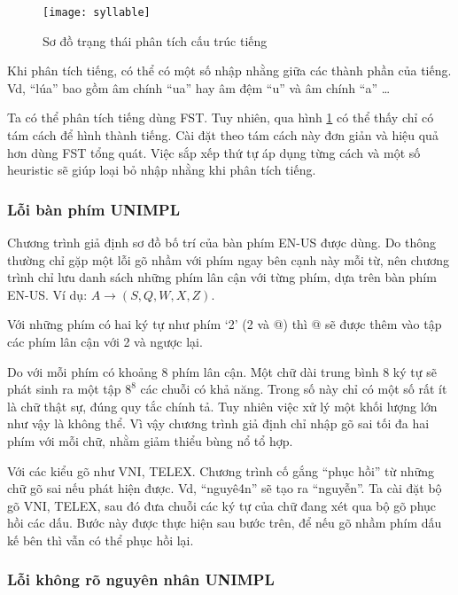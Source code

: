 \documentclass[a4paper,oneside]{book} %
\begin{document}
\begin{figure}[htbp]
  \centering
  \texttt{[image: syllable]}
  \caption{Sơ đồ trạng thái phân tích cấu trúc tiếng}
  \label{fig:syllable}
\end{figure}

Khi phân tích tiếng, có thể có một số nhập nhằng giữa các thành phần
của tiếng. Vd, ``lúa'' bao gồm âm chính ``ua'' hay âm đệm ``u'' và âm
chính ``a'' \ldots

Ta có thể phân tích tiếng dùng FST. Tuy nhiên, qua hình
\ref{fig:syllable} có thể thấy chỉ có tám cách để hình thành
tiếng. Cài đặt theo tám cách này đơn giản và hiệu quả hơn dùng FST
tổng quát. Việc sắp xếp thứ tự áp dụng từng cách và một số heuristic
sẽ giúp loại bỏ nhập nhằng khi phân tích tiếng. 

\subsubsection{Lỗi bàn phím UNIMPL}

Chương trình giả định sơ đồ bố trí của bàn phím EN-US được dùng. Do
thông thường chỉ gặp một lỗi gõ nhầm với phím ngay bên cạnh này mỗi
từ, nên chương trình chỉ lưu danh  sách những phím lân cận với từng
phím, dựa trên bàn phím EN-US. Ví dụ: $A \rightarrow (S,Q,W,X,Z)$. 

Với những phím có hai ký tự như phím `2' (2 và @) thì @ sẽ được thêm
vào tập các phím lân cận với 2 và ngược lại.

Do với mỗi phím có khoảng 8 phím lân cận. Một chữ dài trung bình 8 ký
tự sẽ phát sinh ra một tập $8^8$ các chuỗi có khả năng. Trong số này
chỉ có một số rất ít là chữ thật sự, đúng quy tắc chính tả. Tuy nhiên
việc xử lý một khối lượng lớn như vậy là không thể. Vì vậy chương
trình giả định chỉ nhập gõ sai tối đa hai phím với mỗi chữ, nhằm giảm
thiểu bùng nổ tổ hợp.

Với các kiểu gõ như VNI, TELEX. Chương trình cố gắng ``phục hồi'' từ
những chữ gõ sai nếu phát hiện được. Vd, ``nguyê4n'' sẽ tạo ra
``nguyễn''. Ta cài đặt bộ gõ VNI, TELEX, sau đó đưa chuỗi các ký tự
của chữ đang xét qua bộ gõ phục hồi các dấu. Bước này được thực hiện
sau bước trên, để nếu gõ nhầm phím dấu kế bên thì vẫn có thể phục hồi
lại.

\subsubsection{Lỗi không rõ nguyên nhân UNIMPL}
\end{document}
